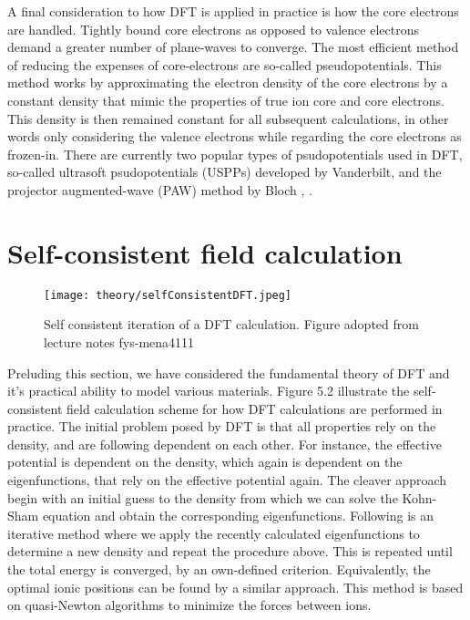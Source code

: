 A final consideration to how DFT is applied in practice is how the core electrons are handled. Tightly bound core electrons as opposed to valence electrons demand a greater number of plane-waves to converge. The most efficient method of reducing the expenses of core-electrons are so-called pseudopotentials. This method works by approximating the electron density of the core electrons by a constant density that mimic the properties of true ion core and core electrons. This density is then remained constant for all subsequent calculations, in other words only considering the valence electrons while regarding the core electrons as frozen-in. There are currently two popular types of psudopotentials used in DFT, so-called ultrasoft psudopotentials (USPPs) developed by Vanderbilt, and the projector augmented-wave (PAW) method by Bloch \cite{PAW1}, \cite{PAW2}.

\section{Self-consistent field calculation}

\begin{figure}[H]
\centering
\texttt{[image: theory/selfConsistentDFT.jpeg]}
\caption{Self consistent iteration of a DFT calculation. Figure adopted from lecture notes fys-mena4111 \cite{persson2020}}
\end{figure}

Preluding this section, we have considered the fundamental theory of DFT and it's practical ability to model various materials. Figure 5.2 illustrate the self-consistent field calculation scheme for how DFT calculations are performed in practice. The initial problem posed by DFT is that all properties rely on the density, and are following dependent on each other. For instance, the effective potential is dependent on the density, which again is dependent on the eigenfunctions, that rely on the effective potential again. The cleaver approach begin with an initial guess to the density from which we can solve the Kohn-Sham equation and obtain the corresponding eigenfunctions. Following is an iterative method where we apply the recently calculated eigenfunctions to determine a new density and repeat the procedure above. This is repeated until the total energy is converged, by an own-defined criterion. Equivalently, the optimal ionic positions can be found by a similar approach. This method is based on quasi-Newton algorithms to minimize the forces between ions. 




